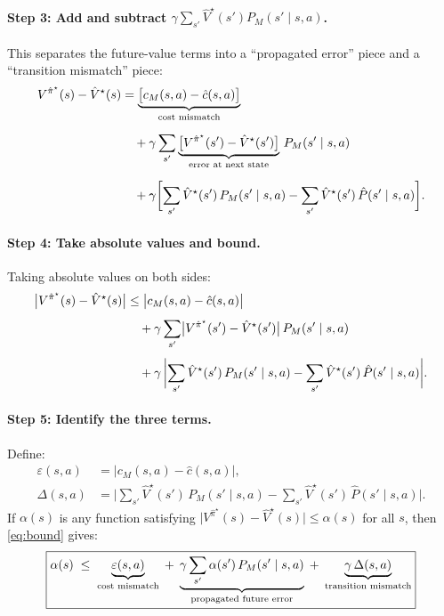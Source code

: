 \documentclass[11pt]{article}
\newcommand{\pihatstar}{\hat\pi^\star}
\newcommand{\Vhatstar}{\hat V^\star}
\newcommand{\Vpihat}{V^{\pihatstar}}
\begin{document}
\paragraph{Step 3: Add and subtract $\gamma \sum_{s'} \Vhatstar(s') P_M(s' \mid s, a)$.}
This separates the future-value terms into a ``propagated error'' piece and
a ``transition mismatch'' piece:
\begin{align}
  \Vpihat(s) - \Vhatstar(s)
  &= \underbrace{\bigl[c_M(s,a) - \hat c(s,a)\bigr]}_{\text{cost mismatch}}
  \notag \\[6pt]
  &\quad + \gamma \sum_{s'}
    \underbrace{\bigl[\Vpihat(s') - \Vhatstar(s')\bigr]}_{\text{error at next state}}\,
    P_M(s' \mid s, a)
  \label{eq:decomposed} \\[6pt]
  &\quad + \gamma \biggl[
    \sum_{s'} \Vhatstar(s')\, P_M(s' \mid s, a)
    - \sum_{s'} \Vhatstar(s')\, \hat P(s' \mid s, a)
  \biggr].
  \notag
\end{align}

\paragraph{Step 4: Take absolute values and bound.}
Taking absolute values on both sides:
\begin{align}
  \bigl|\Vpihat(s) - \Vhatstar(s)\bigr|
  &\le \bigl|c_M(s,a) - \hat c(s,a)\bigr|
  \notag \\[4pt]
  &\quad + \gamma \sum_{s'} \bigl|\Vpihat(s') - \Vhatstar(s')\bigr|\, P_M(s' \mid s, a)
  \label{eq:bound} \\[4pt]
  &\quad + \gamma\, \biggl|
    \sum_{s'} \Vhatstar(s')\, P_M(s' \mid s, a)
    - \sum_{s'} \Vhatstar(s')\, \hat P(s' \mid s, a)
  \biggr|.
  \notag
\end{align}

\paragraph{Step 5: Identify the three terms.}
Define:
\begin{align*}
  \varepsilon(s, a) &= \bigl|c_M(s,a) - \hat c(s,a)\bigr|,
  \\[4pt]
  \Delta(s, a) &= \biggl|
    \sum_{s'} \Vhatstar(s')\, P_M(s' \mid s, a)
    - \sum_{s'} \Vhatstar(s')\, \hat P(s' \mid s, a)
  \biggr|.
\end{align*}
If $\alpha(s)$ is any function satisfying
$\bigl|\Vpihat(s) - \Vhatstar(s)\bigr| \le \alpha(s)$ for all $s$, then
\eqref{eq:bound} gives:
\begin{equation}\label{eq:beta-final}
  \boxed{%
    \alpha(s)
    \;\le\; \underbrace{\varepsilon(s,a)}_{\text{cost mismatch}}
    \;+\; \underbrace{\gamma \sum_{s'} \alpha(s')\, P_M(s' \mid s, a)}_{\text{propagated future error}}
    \;+\; \underbrace{\gamma\, \Delta(s,a)}_{\text{transition mismatch}}
  }
\end{equation}
\end{document}
